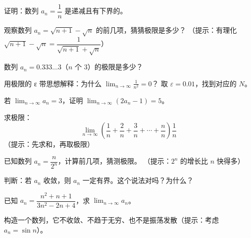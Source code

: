 \begin{exercise}[3]
证明：数列 \(a_n = \dfrac{1}{n}\) 是递减且有下界的。
\end{exercise}

\begin{exercise}[3]
观察数列 \(a_n = \sqrt{n+1} - \sqrt{n}\) 的前几项，猜猜极限是多少？
（提示：有理化 \( \sqrt{n+1} - \sqrt{n} = \dfrac{1}{\sqrt{n+1} + \sqrt{n}} \)）
\end{exercise}

\begin{exercise}[3]
数列 \(a_n = 0.333\ldots 3\)（\(n\) 个 3）的极限是多少？
\end{exercise}


\begin{exercise}[4]
用极限的 ε 带思想解释：为什么 \(\displaystyle\lim_{n\to\infty} \frac{1}{n^2} = 0\)？
取 \(\varepsilon = 0.01\)，找到对应的 \(N\)。
\end{exercise}

\begin{exercise}[4]
若 \(\displaystyle\lim_{n\to\infty} a_n = 3\)，证明 \(\displaystyle\lim_{n\to\infty} (2a_n - 1) = 5\)。
\end{exercise}

\begin{exercise}[4]
求极限：
\[
\lim_{n\to\infty} \left(\frac{1}{n} + \frac{2}{n} + \frac{3}{n} + \cdots + \frac{n}{n}\right) \frac{1}{n}
\]
（提示：先求和，再取极限）
\end{exercise}

\begin{exercise}[4]
已知数列 \(a_n = \dfrac{n}{2^n}\)，计算前几项，猜测极限。
（提示：\(2^n\) 的增长比 \(n\) 快得多）
\end{exercise}

\begin{exercise}[4]
判断：若 \(a_n\) 收敛，则 \(a_n\) 一定有界。这个说法对吗？为什么？
\end{exercise}


\begin{exercise}[5]
已知 \(a_n = \dfrac{n^2 + n + 1}{3n^2 - 2n + 4}\)，求 \(\displaystyle\lim_{n\to\infty} a_n\)。
\end{exercise}

\begin{exercise}[5]
构造一个数列，它不收敛、不趋于无穷、也不是振荡发散（提示：考虑 \(a_n = \sin n\)）。
\end{exercise}


